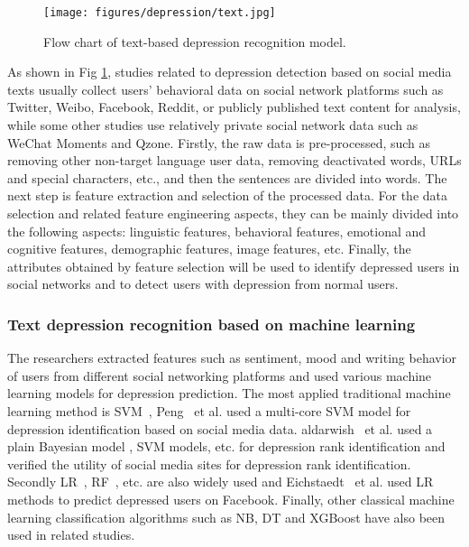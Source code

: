 
\begin{figure}[tbp]
	\centering	
	\label{fig_hard_case1}\texttt{[image: figures/depression/text.jpg]}		
	\caption{
	Flow chart of text-based depression recognition model.
	}
	\label{text}
\end{figure}

As shown in Fig \ref{text}, studies related to depression detection based on social media texts usually collect users' behavioral data on social network platforms such as Twitter, Weibo, Facebook, Reddit, or publicly published text content for analysis, while some other studies use relatively private social network data such as WeChat Moments and Qzone. Firstly, the raw data is pre-processed, such as removing other non-target language user data, removing deactivated words, URLs and special characters, etc., and then the sentences are divided into words. The next step is feature extraction and selection of the processed data. For the data selection and related feature engineering aspects, they can be mainly divided into the following aspects: linguistic features, behavioral features, emotional and cognitive features, demographic features, image features, etc. Finally, the attributes obtained by feature selection will be used to identify depressed users in social networks and to detect users with depression from normal users.

\subsubsection{Text depression recognition based on machine learning}
\label{sec_fquality}

The researchers extracted features such as sentiment, mood and writing behavior of users from different social networking platforms and used various machine learning models for depression prediction.
The most applied traditional machine learning method is SVM~\cite{shing2018expert,smys2021analysis}, Peng~\cite{peng2019multi} et al. used a multi-core SVM model for depression identification based on social media data. aldarwish~\cite{aldarwish2017predicting} et al. used a plain Bayesian model , SVM models, etc. for depression rank identification and verified the utility of social media sites for depression rank identification. Secondly LR~\cite{eichstaedt2018facebook}, RF~\cite{tate2020predicting,kwakernaak2020using}, etc. are also widely used and Eichstaedt~\cite{eichstaedt2018facebook} et al. used LR methods to predict depressed users on Facebook. Finally, other classical machine learning classification algorithms such as NB, DT and XGBoost have also been used in related studies.

